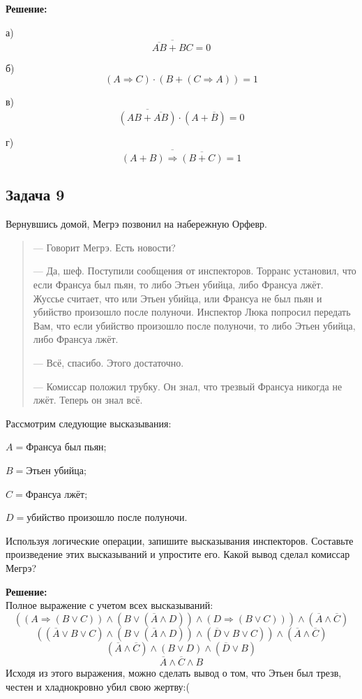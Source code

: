 \documentclass[a4paper,12pt]{article}
\begin{document}
\textbf{Решение:}
\item[а)]
\[
\overline{\overline{AB} + BC} = 0
\]
\item[б)]
\[
(A \Rightarrow C) \cdot (B + (C \Rightarrow A)) = 1
\]
\item[в)]
\[
\overline{(AB + \overline{AB})} \cdot (A + \overline{B}) = 0
\]
\item[г)]
\[
\overline{(A + B) \Rightarrow \overline{(B + C)}} = 1
\]
\vspace{1cm}

\subsection{Задача 9}
Вернувшись домой, Мегрэ позвонил на набережную Орфевр.
\begin{quote}
    — Говорит Мегрэ. Есть новости?

    — Да, шеф. Поступили сообщения от инспекторов. Торранс установил, что если Франсуа был пьян, то либо Этьен убийца, либо Франсуа лжёт. Жуссье считает, что или Этьен убийца, или Франсуа не был пьян и убийство произошло после полуночи. Инспектор Люка попросил передать Вам, что если убийство произошло после полуночи, то либо Этьен убийца, либо Франсуа лжёт.

    — Всё, спасибо. Этого достаточно.

    — Комиссар положил трубку. Он знал, что трезвый Франсуа никогда не лжёт. Теперь он знал всё.
\end{quote}

Рассмотрим следующие высказывания:

\(A = \text{Франсуа был пьян}\);

\(B = \text{Этьен убийца}\);

\(C = \text{Франсуа лжёт}\);

\(D = \text{убийство произошло после полуночи}\).

Используя логические операции, запишите высказывания инспекторов. Составьте произведение этих высказываний и упростите его. Какой вывод сделал комиссар Мегрэ?

\textbf{Решение:}\\
Полное выражение с учетом всех высказываний:
\[
((A \Rightarrow (B \lor C)) \land (B \lor (\overline{A} \land D)) \land (D \Rightarrow (B \lor C))) \land (\overline{A} \land \overline{C})
\]
\[
((\overline{A} \lor B \lor C) \land (B \lor (\overline{A} \land D)) \land (\overline{D} \lor B \lor C)) \land (\overline{A} \land \overline{C})
\]
\[
(\overline{A} \land \overline{C}) \land (B \lor D) \land (\overline{D} \lor B)
\]
\[
\overline{A} \land \overline{C} \land B
\]
Исходя из этого выражения, можно сделать вывод о том, что Этьен был трезв, честен и хладнокровно убил свою жертву:(
\vspace{1cm}
\end{document}

